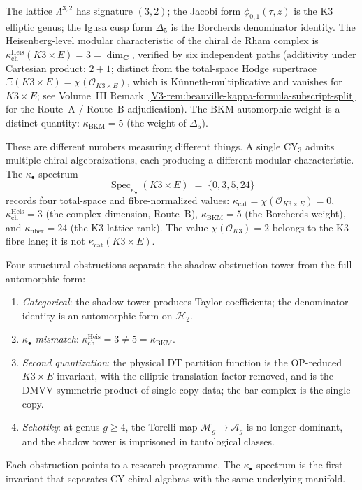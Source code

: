 \documentclass[11pt,reqno]{amsart}
\theoremstyle{definition}
\theoremstyle{remark}
\newcommand{\cH}{\mathcal{H}}
\newcommand{\cM}{\mathcal{M}}
\renewcommand{\Bbbk}{\mathbf{C}}
\numberwithin{equation}{section}
\begin{document}
The lattice $\Lambda^{3,2}$ has signature $(3,2)$; the
Jacobi form $\phi_{0,1}(\tau, z)$ is the K3 elliptic genus;
the Igusa cusp form $\Delta_5$ is the Borcherds denominator
identity. The Heisenberg-level modular characteristic of the chiral
de Rham complex is $\kappa_{\mathrm{ch}}^{\mathrm{Heis}}(K3 \times E) = 3
= \dim_\Bbbk$, verified by six independent paths (additivity
under Cartesian product: $2 + 1$; distinct from the total-space
Hodge supertrace $\Xi(K3\times E)=\chi(\mathcal{O}_{K3\times E})$,
which is K\"unneth-multiplicative and vanishes for $K3 \times E$; see Volume~III
Remark~\ref{V3-rem:beauville-kappa-formula-subscript-split} for the
Route~A / Route~B adjudication). The BKM
automorphic weight is a distinct quantity:
$\kappa_{\mathrm{BKM}} = 5$ (the weight of $\Delta_5$).

These are different numbers measuring different things.
A single CY$_3$ admits multiple chiral algebraizations,
each producing a different modular characteristic. The
$\kappa_\bullet$-spectrum
\begin{equation}\label{eq:kappa-spectrum}
\operatorname{Spec}_{\kappa_\bullet}(K3 \times E)
\;=\; \{0, 3, 5, 24\}
\end{equation}
records four total-space and fibre-normalized values:
$\kappa_{\mathrm{cat}}=\chi(\mathcal{O}_{K3\times E})=0$,
$\kappa_{\mathrm{ch}}^{\mathrm{Heis}}=3$ (the complex dimension,
Route~B), $\kappa_{\mathrm{BKM}}=5$ (the Borcherds weight), and
$\kappa_{\mathrm{fiber}}=24$ (the K3 lattice rank). The value
$\chi(\mathcal{O}_{K3})=2$ belongs to the K3 fibre lane; it is not
$\kappa_{\mathrm{cat}}(K3\times E)$.

Four structural obstructions separate the shadow obstruction
tower from the full automorphic form:
\begin{enumerate}[label=\textup{(O\arabic*)}]
\item \emph{Categorical}: the shadow tower produces Taylor
 coefficients; the denominator identity is an automorphic form
 on $\cH_2$.
\item \emph{$\kappa_\bullet$-mismatch}:
 $\kappa_{\mathrm{ch}}^{\mathrm{Heis}} = 3 \ne 5 =
 \kappa_{\mathrm{BKM}}$.
\item \emph{Second quantization}: the physical DT partition
 function is the OP-reduced $K3\times E$ invariant, with the
 elliptic translation factor removed, and is the DMVV symmetric
 product of single-copy data; the bar complex is the single copy.
\item \emph{Schottky}: at genus $g \ge 4$, the Torelli map
 $\cM_g \to \mathcal{A}_g$ is no longer dominant, and the
 shadow tower is imprisoned in tautological classes.
\end{enumerate}
Each obstruction points to a research programme. The
$\kappa_\bullet$-spectrum is the first invariant that separates CY
chiral algebras with the same underlying manifold.
\end{document}
